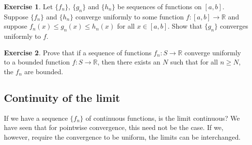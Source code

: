 \documentclass[12pt,openany]{book}
\newcommand{\R}{{\mathbb{R}}}
\theoremstyle{plain}
\theoremstyle{remark}
\theoremstyle{definition}
\newenvironment{exbox}{%
    \def\FrameCommand{\vrule width 1pt \relax\hspace {10pt}}%
    \MakeFramed {\advance \hsize -\width \FrameRestore }%
}{%
    \endMakeFramed
}
\newenvironment{exparts}{%
    \leavevmode\begin{enumerate}[a),noitemsep,topsep=0pt,parsep=0pt,partopsep=0pt]
}{%
    \end{enumerate}
}
\theoremstyle{exercise}
\newtheorem{exercise}{Exercise}[section]
\theoremstyle{example}
\newcommand{\exampleref}[1]{\hyperref[#1]{Example~\ref*{#1}}}
\begin{document}
\begin{exbox}
\begin{exercise}
Let $\{ f_n \}$, $\{ g_n \}$ and $\{ h_n \}$ be sequences of functions on
$[a,b]$.  Suppose $\{ f_n \}$ and $\{ h_n \}$ converge uniformly to some function
$f \colon [a,b] \to \R$ and suppose $f_n(x) \leq g_n(x) \leq h_n(x)$
for all $x \in [a,b]$.  Show that $\{ g_n \}$ converges uniformly to $f$.
\end{exercise}



\begin{exercise}
Prove that
if a sequence of functions $f_n \colon S \to \R$
converge uniformly to a bounded function $f \colon S \to \R$,
then there exists an $N$ such that for all $n \geq N$, the $f_n$
are bounded.
\end{exercise}

\end{exbox}

\subsection{Continuity of the limit}

If we have a sequence $\{ f_n \}$ of continuous functions,
is the limit continuous?  We have seen that for pointwise
convergence, this need not be the case.
If we, however, require the convergence to be uniform, the limits can
be interchanged.
\end{document}
